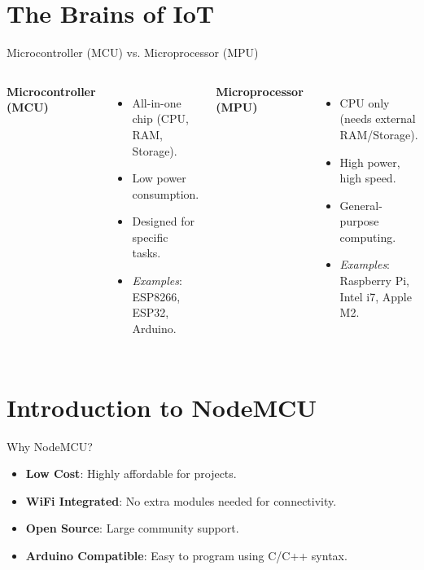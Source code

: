 \documentclass[aspectratio=169]{beamer}
\begin{document}
\section{The Brains of IoT}
\begin{frame}{Microcontroller (MCU) vs. Microprocessor (MPU)}
    \begin{columns}
        \textbf{Microcontroller (MCU)}
        \begin{itemize}
            \item All-in-one chip (CPU, RAM, Storage).
            \item Low power consumption.
            \item Designed for specific tasks.
            \item \textit{Examples}: ESP8266, ESP32, Arduino.
        \end{itemize}
        
        \textbf{Microprocessor (MPU)}
        \begin{itemize}
            \item CPU only (needs external RAM/Storage).
            \item High power, high speed.
            \item General-purpose computing.
            \item \textit{Examples}: Raspberry Pi, Intel i7, Apple M2.
        \end{itemize}
    \end{columns}
\end{frame}

\section{Introduction to NodeMCU}
\begin{frame}{Why NodeMCU?}
    \begin{itemize}
        \item \textbf{Low Cost}: Highly affordable for projects.
        \item \textbf{WiFi Integrated}: No extra modules needed for connectivity.
        \item \textbf{Open Source}: Large community support.
        \item \textbf{Arduino Compatible}: Easy to program using C/C++ syntax.
    \end{itemize}
    \centering
\end{frame}
\end{document}
